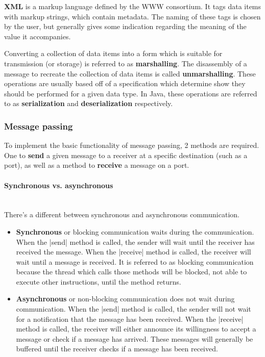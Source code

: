 \documentclass[a4paper]{article}
\newcommand{\subsubsubsection}[1]{\paragraph{#1}\mbox{}\\}
\begin{document}
\textbf{XML} is a markup language defined by the WWW consortium. It tags data items with markup strings, which contain metadata. The naming of these tags is chosen by the user, but generally gives some indication regarding the meaning of the value it accompanies.

Converting a collection of data items into a form which is suitable for transmission (or storage) is referred to as \textbf{marshalling}. The disassembly of a message to recreate the collection of data items is called \textbf{unmarshalling}. These operations are usually based off of a specification which determine show they should be performed for a given data type. In Java, these operations are referred to as \textbf{serialization} and \textbf{deserialization} respectively.

\subsubsection{Message passing}

To implement the basic functionality of message passing, 2 methods are required. One to \textbf{send} a given message to a receiver at a specific destination (such as a port), as well as a method to \textbf{receive} a message on a port.

\subsubsubsection{Synchronous vs. asynchronous}

There's a different between synchronous and asynchronous communication.

\begin{itemize}
\item \textbf{Synchronous} or blocking communication waits during the communication. When the |send| method is called, the sender will wait until the receiver has received the message. When the |receive| method is called, the receiver will wait until a message is received. It is referred to as blocking communication because the thread which calls those methods will be blocked, not able to execute other instructions, until the method returns.
\item \textbf{Asynchronous} or non-blocking communication does not wait during communication. When the |send| method is called, the sender will not wait for a notification that the message has been received. When the |receive| method is called, the receiver will either announce its willingness to accept a message or check if a message has arrived. These messages will generally be buffered until the receiver checks if a message has been received.
\end{itemize}
\end{document}
